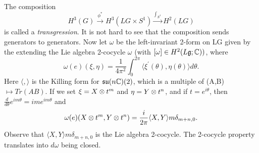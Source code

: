 The composition 
\begin{equation*}
 H^3(G) \stackrel{\phi^{*}}{\rightarrow} H^{3}(LG \times S^{1}) \stackrel{\int_{S^{1}}}{\rightarrow} H^{2}(LG)
\end{equation*}
  is called a \textit{transgression}. It is not hard to see that the composition sends generators to generators. 
  Now let $\omega$ be the left-invariant 2-form on LG given by the extending the Lie algebra 2-cocycle $\omega$
  (with $[\omega]\in H^{2}(L\mathfrak{g};\mathbb{C}))$, where 
  \begin{equation*}
   \omega(e)(\xi, \eta) = \dfrac{1}{4 \pi^{2}} \int_{0}^{2\pi} \langle \xi^{'}(\theta) , \eta(\theta) \rangle d\theta.
  \end{equation*}
Here $\langle, \rangle$ is the Killing form for $\mathfrak{su}(n\mathbb{C}) (2)$, which is a multiple of (A,B) $\mapsto Tr(AB)$. If we set
$\xi = X \otimes t^{m}$ and $\eta = Y \otimes t^{n}$, and if $t = e^{i\theta}$, then 
$\frac{d}{d\theta}e^{im\theta} = im e^{im\theta}$ and 
\begin{equation}\label{5}
 \omega(e)(X \otimes t^{m}, Y \otimes t^{n}) = \dfrac{i}{2\pi}\langle X,Y \rangle m \delta_{m+n,0}.
\end{equation}
Observe that $\langle X,Y \rangle m\delta_{m+n,0}$ is the Lie algebra 2-cocycle. The 2-cocycle property translates into
$d\omega$ being closed. 
